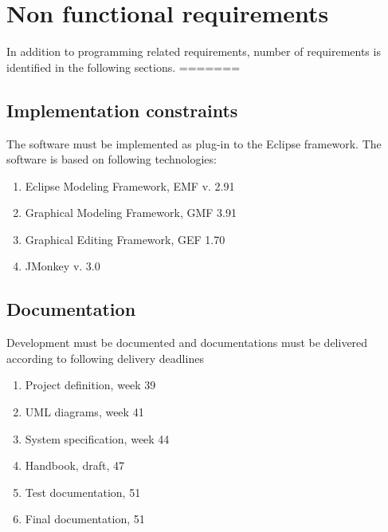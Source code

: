 \section{Non functional requirements}
In addition to programming related requirements, number of requirements is identified in the following sections.
=======
\label{sec:non-functional}

\subsection{Implementation constraints}
The software must be implemented as plug-in to the Eclipse framework. The software is based on following technologies:
\begin{enumerate}
	\item Eclipse Modeling Framework, EMF v. 2.91
	\item Graphical Modeling Framework, GMF 3.91
	\item Graphical Editing Framework, GEF 1.70
	\item JMonkey v. 3.0
\end{enumerate}

\subsection{Documentation}
Development must be documented and documentations must be delivered according to following delivery deadlines
\begin{enumerate}
	\item Project definition, week 39
	\item UML diagrams, week 41
	\item System specification, week 44
	\item Handbook, draft, 47
	\item Test documentation, 51
	\item Final documentation, 51
\end{enumerate}

